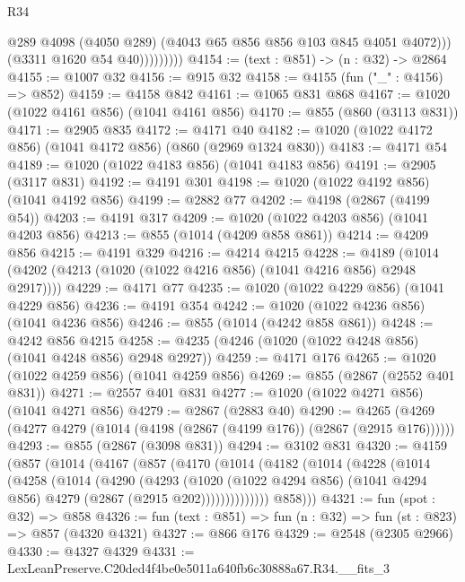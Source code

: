 \begin{lexlean}{R34}
\begin{coremodule}
                        @289
                        @4098
                        (@4050 @289)
                        (@4043 @65 @856 @856 @103 @845 @4051 @4072)))
                    (@3311 @1620 @54 @40)))))))))
@4154 := (text : @851) -> (n : @32) -> @2864
@4155 := @1007 @32
@4156 := @915 @32
@4158 := @4155 (fun ("_" : @4156) => @852)
@4159 := @4158 @842
@4161 := @1065 @831 @868
@4167 := @1020 (@1022 @4161 @856) (@1041 @4161 @856)
@4170 := @855 (@860 (@3113 @831))
@4171 := @2905 @835
@4172 := @4171 @40
@4182 := @1020 (@1022 @4172 @856) (@1041 @4172 @856) (@860 (@2969 @1324 @830))
@4183 := @4171 @54
@4189 := @1020 (@1022 @4183 @856) (@1041 @4183 @856)
@4191 := @2905 (@3117 @831)
@4192 := @4191 @301
@4198 := @1020 (@1022 @4192 @856) (@1041 @4192 @856)
@4199 := @2882 @77
@4202 := @4198 (@2867 (@4199 @54))
@4203 := @4191 @317
@4209 := @1020 (@1022 @4203 @856) (@1041 @4203 @856)
@4213 := @855 (@1014 (@4209 @858 @861))
@4214 := @4209 @856
@4215 := @4191 @329
@4216 := @4214 @4215
@4228 := @4189 (@1014 (@4202 (@4213 (@1020 (@1022 @4216 @856) (@1041 @4216 @856) @2948 @2917))))
@4229 := @4171 @77
@4235 := @1020 (@1022 @4229 @856) (@1041 @4229 @856)
@4236 := @4191 @354
@4242 := @1020 (@1022 @4236 @856) (@1041 @4236 @856)
@4246 := @855 (@1014 (@4242 @858 @861))
@4248 := @4242 @856 @4215
@4258 := @4235 (@4246 (@1020 (@1022 @4248 @856) (@1041 @4248 @856) @2948 @2927))
@4259 := @4171 @176
@4265 := @1020 (@1022 @4259 @856) (@1041 @4259 @856)
@4269 := @855 (@2867 (@2552 @401 @831))
@4271 := @2557 @401 @831
@4277 := @1020 (@1022 @4271 @856) (@1041 @4271 @856)
@4279 := @2867 (@2883 @40)
@4290 := @4265 (@4269 (@4277 @4279 (@1014 (@4198 (@2867 (@4199 @176)) (@2867 (@2915 @176))))))
@4293 := @855 (@2867 (@3098 @831))
@4294 := @3102 @831
@4320 := @4159
    (@857
      (@1014
        (@4167
          (@857
            (@4170
              (@1014
                (@4182
                  (@1014
                    (@4228
                      (@1014
                        (@4258
                          (@1014
                            (@4290
                              (@4293
                                (@1020
                                  (@1022 @4294 @856)
                                  (@1041 @4294 @856)
                                  @4279
                                  (@2867 (@2915 @202))))))))))))))
          @858)))
@4321 := fun (spot : @32) => @858
@4326 := fun (text : @851) => fun (n : @32) => fun (st : @823) => @857 (@4320 @4321)
@4327 := @866 @176
@4329 := @2548 (@2305 @2966)
@4330 := @4327 @4329
@4331 := LexLeanPreserve.C20ded4f4be0e5011a640fb6c30888a67.R34.__fits_3

\end{coremodule}
\end{lexlean}
